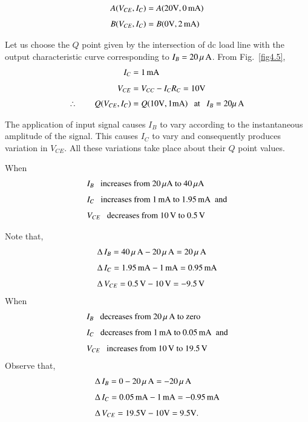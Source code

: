 \eject

~\phantom{a}

\vskip -1cm

\begin{align*}
A(V_{CE},I_{C}) &= A(20\text{V}, 0\text{\,mA})\\[4pt]
B(V_{CE},I_{C}) &= B(0\text{V},2\text{\,mA})
\end{align*}

Let us choose the $Q$ point given by the intersection of dc load line with the output characteristic curve corresponding to $I_{B}=20\,\mu\text{\,A}$. From Fig.~\ref{fig4.5},
\begin{align*}
I_{C} &= 1\text{\,mA}\\[4pt]
V_{CE} &= V_{CC}-I_{C}R_{C}=10\text{V}\\[3pt]
\therefore\qquad Q(V_{CE}, I_{C}) &= Q(10\text{V}, 1\text{mA})\text{~~ at~~ } I_{B}=20\mu\text{\,A}
\end{align*}

The application of input signal causes $I_{B}$ to vary according to the instantaneous amplitude of the signal. This causes $I_{C}$ to vary and consequently produces variation in $V_{CE}$. All these variations take place about their $Q$ point values.

When
\begin{align*}
& I_{B}\text{~~ increases from 20}\,\mu \text{A to 40}\,\mu \text{A}\\[4pt]
& I_{C}\text{~~ increases from 1\,mA to 1.95\,mA~ and}\\[4pt]
& V_{CE}\text{~~ decreases from 10\,V to 0.5\,V}
\end{align*}

Note that,
\begin{align*}
& \Delta\, I_{B} = 40\,\mu\text{\,A}-20\,\mu\text{\,A}=20\,\mu\text{\,A}\\[4pt]
& \Delta\, I_{C} = 1.95\text{\,mA}-1\text{\,mA}=0.95\text{\,mA}\\[4pt]
& \Delta\, V_{CE} = 0.5\text{\,V}-10\text{\,V}=-9.5\text{\,V}
\end{align*}
When
\begin{align*}
& I_{B} \text{~~ decreases from 20}\,\mu\,\text{A to zero}\\[4pt]
& I_{C} \text{~~ decreases from 1\,mA to 0.05\,mA \ and}\\[4pt]
& V_{CE}\text{~~ increases from 10\,V to 19.5\,V}
\end{align*}
Observe that,
\begin{align*}
& \Delta\, I_{B} = 0-20\,\mu\text{\,A}=-20\,\mu\text{\,A}\\[4pt]
& \Delta\, I_{C} = 0.05\text{\,mA}-1\text{\,mA}=-0.95\text{\,mA}\\[4pt]
& \Delta\, V_{CE} = 19.5\text{V}-10\text{V}=9.5\text{V}.
\end{align*}

